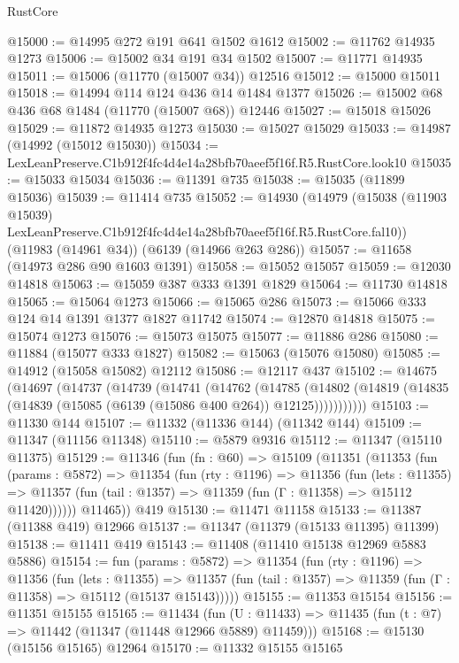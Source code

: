 \begin{lexlean}{RustCore}
\begin{coremodule}
@15000 := @14995 @272 @191 @641 @1502 @1612
@15002 := @11762 @14935 @1273
@15006 := @15002 @34 @191 @34 @1502
@15007 := @11771 @14935
@15011 := @15006 (@11770 (@15007 @34)) @12516
@15012 := @15000 @15011
@15018 := @14994 @114 @124 @436 @14 @1484 @1377
@15026 := @15002 @68 @436 @68 @1484 (@11770 (@15007 @68)) @12446
@15027 := @15018 @15026
@15029 := @11872 @14935 @1273
@15030 := @15027 @15029
@15033 := @14987 (@14992 (@15012 @15030))
@15034 := LexLeanPreserve.C1b912f4fc4d4e14a28bfb70aeef5f16f.R5.RustCore.look10
@15035 := @15033 @15034
@15036 := @11391 @735
@15038 := @15035 (@11899 @15036)
@15039 := @11414 @735
@15052 := @14930
    (@14979
      (@15038 (@11903 @15039) LexLeanPreserve.C1b912f4fc4d4e14a28bfb70aeef5f16f.R5.RustCore.fal10))
    (@11983 (@14961 @34))
    (@6139 (@14966 @263 @286))
@15057 := @11658 (@14973 @286 @90 @1603 @1391)
@15058 := @15052 @15057
@15059 := @12030 @14818
@15063 := @15059 @387 @333 @1391 @1829
@15064 := @11730 @14818
@15065 := @15064 @1273
@15066 := @15065 @286
@15073 := @15066 @333 @124 @14 @1391 @1377 @1827 @11742
@15074 := @12870 @14818
@15075 := @15074 @1273
@15076 := @15073 @15075
@15077 := @11886 @286
@15080 := @11884 (@15077 @333 @1827)
@15082 := @15063 (@15076 @15080)
@15085 := @14912 (@15058 @15082) @12112
@15086 := @12117 @437
@15102 := @14675
    (@14697
      (@14737
        (@14739
          (@14741
            (@14762
              (@14785
                (@14802 (@14819 (@14835 (@14839 (@15085 (@6139 (@15086 @400 @264)) @12125)))))))))))
@15103 := @11330 @144
@15107 := @11332 (@11336 @144) (@11342 @144)
@15109 := @11347 (@11156 @11348)
@15110 := @5879 @9316
@15112 := @11347 (@15110 @11375)
@15129 := @11346
    (fun (fn : @60) =>
    @15109
      (@11351
        (@11353
          (fun (params : @5872) =>
          @11354
            (fun (rty : @1196) =>
            @11356
              (fun (lets : @11355) =>
              @11357 (fun (tail : @1357) => @11359 (fun (Γ : @11358) => @15112 @11420))))))
        @11465))
    @419
@15130 := @11471 @11158
@15133 := @11387 (@11388 @419) @12966
@15137 := @11347 (@11379 (@15133 @11395) @11399)
@15138 := @11411 @419
@15143 := @11408 (@11410 @15138 @12969 @5883 @5886)
@15154 := fun (params : @5872) =>
  @11354
    (fun (rty : @1196) =>
    @11356
      (fun (lets : @11355) =>
      @11357 (fun (tail : @1357) => @11359 (fun (Γ : @11358) => @15112 (@15137 @15143)))))
@15155 := @11353 @15154
@15156 := @11351 @15155
@15165 := @11434
    (fun (U : @11433) => @11435 (fun (t : @7) => @11442 (@11347 (@11448 @12966 @5889) @11459)))
@15168 := @15130 (@15156 @15165) @12964
@15170 := @11332 @15155 @15165

\end{coremodule}
\end{lexlean}
